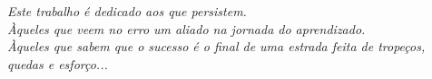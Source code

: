 \begin{dedicatoria}
   \vspace*{\fill}
   \centering
   \noindent
   \textit{Este trabalho é dedicado aos que persistem.\\
           Àqueles que veem no erro um aliado na jornada do aprendizado.\\
           Àqueles que sabem que o sucesso é o final de uma estrada feita de tropeços, quedas e esforço...} \vspace*{\fill}
\end{dedicatoria}
